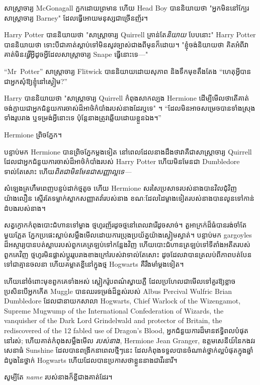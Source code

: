សាស្រ្តាចារ្យ McGonagall ក្អកដោយព្រមាន ហើយ Head Boy បាននិយាយថា "អ្នកមិននៅក្បែរសាស្រ្តាចារ្យ Barney" ដែលធ្វើអោយមនុស្សជាច្រើនញ័រ។

Harry Potter បាននិយាយថា "សាស្រ្តាចារ្យ Quirrell គ្រាន់តែ\emph{និយាយ} បែបនោះ" Harry Potter បាននិយាយថា ទោះបីជាគាត់ស្តាប់ទៅមិនសូវច្បាស់ជាងពីមុនក៏ដោយ។ "ខ្ញុំចង់និយាយថា គិតអំពីវា គាត់មិន\emph{ធ្វើ}អ្វីដូចអ្វីដែលសាស្រ្តាចារ្យ Snape ធ្វើនោះទេ—"

“Mr~Potter” សាស្ត្រាចារ្យ Flitwick បាននិយាយដោយសុភាព និងទឹកមុខតឹងតែង “ហេតុអ្វីបានជាអ្នកសុំឱ្យខ្ញុំនៅស្ងៀម?”

Harry បាននិយាយថា "សាស្រ្តាចារ្យ Quirrell កំពុងសាកល្បង Hermione ដើម្បីមើលថាតើគាត់ចង់ក្លាយជាអ្នកជំនួយការចាស់ដ៏អាថ៌កំបាំងរបស់នាងដែរឬទេ" ។ “ដែល​មិន​អាច​សម្រេច​បាន​ទាំង​ស្រុង​ទាំង​រូបរាង ឬ​ទម្រង់​អ្វី​នោះ​ទេ ប៉ុន្តែ​នាង​ត្រូវ​ឆ្លើយ​ដោយ​ខ្លួន​ឯង។”

Hermione ព្រិចភ្នែក។

បន្ទាប់មក Hermione បានព្រិចភ្នែកម្តងទៀត នៅពេលដែលនាងដឹងថាវាគឺជាសាស្រ្តាចារ្យ Quirrell ដែលជាអ្នកជំនួយការចាស់ដ៏អាថ៌កំបាំងរបស់ Harry Potter ហើយមិនមែនជា Dumbledore ទាល់តែសោះ ហើយ\emph{ពិតជាមិនមែនជាសញ្ញាល្អទេ—}

សំឡេងគ្រហឹមពេញបន្ទប់ដាក់ថ្មតូច ហើយ Hermione សរសៃប្រសាទរបស់នាងបានវិលជុំវិញយ៉ាងលឿន ស្ទើរតែទម្លាក់ស្លាកសញ្ញាតវ៉ារបស់នាង ខណៈដែលដៃម្ខាងទៀតរបស់នាងបានលូនទៅកាន់ដំបងរបស់នាង។

សត្វក្ងោកកំពុងបោះជំហានទៅម្ខាង ថ្មហូរញ័រដូចថ្មនៅពេលវារើដូចសាច់។ តួ​អាក្រក់​ដ៏​ធំ​បាន​រង់​ចាំ​តែ​មួយ​ភ្លែត ភ្នែក​ប្រផេះ​ស្លាប់​សម្លឹង​មើល​ដោយ​ការ​ប្រុង​ប្រយ័ត្ន​យ៉ាង​ស្ងៀម​ស្ងាត់។ បន្ទាប់មក gargoyles ដ៏អស្ចារ្យបានបត់ស្លាបរបស់ពួកគេត្រឡប់ទៅកន្លែងវិញ ហើយបោះជំហានត្រឡប់ទៅទីតាំងអតីតរបស់ពួកគេវិញ ថ្មហូរមិនផ្លាស់ប្តូររូបរាងខាងក្រៅរបស់វាទាល់តែសោះ ដូចដែលវាបានត្រលប់ពីភាពបត់បែនទៅជាគ្មានចលនា ហើយគម្លាតខ្លីនៅក្នុងថ្ម Hogwarts គឺរឹងមាំម្តងទៀត។

ហើយនៅចំពោះមុខពួកគេទាំងអស់ ស្លៀករ៉ូបពណ៌ស្វាយភ្លឺ ដែលប្រហែលជាមើលទៅគួរឱ្យខ្លាច ប្រសិនបើអ្នកកើត Muggle បានឈរទម្រង់ដ៏ខ្ពស់របស់ Albus Percival Wulfric Brian Dumbledore ដែលជានាយកសាលា Hogwarts, Chief Warlock of the Wizengamot, Supreme Mugwump of the International Confederation of Wizards, the vanquisher of the Dark Lord Grindelwald and protector of Britain, the rediscovered of the 12 fabled use of Dragon's Blood, អ្នកជំនួយការដ៏មានឥទ្ធិពលបំផុតនៅរស់; ហើយគាត់កំពុងសម្លឹងមើល \emph{របស់នាង}, Hermione Jean Granger, ឧត្តមសេនីយ៍នៃកងវរសេនាធំ Sunshine ដែលបានពង្រីកនាពេលថ្មីៗនេះ ដែលកំពុងទទួលបានចំណាត់ថ្នាក់ល្អបំផុតក្នុងឆ្នាំដំបូងនៃថ្នាក់ Hogwarts ហើយដែលបានប្រកាសថាខ្លួននាងជាវីរនារី។

សូម្បីតែ \emph{name} របស់នាងក៏ខ្លីជាងគាត់ដែរ។

